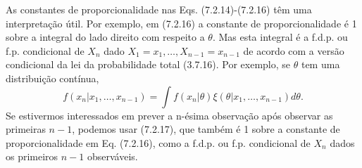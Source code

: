 As constantes de proporcionalidade nas Eqs. (7.2.14)-(7.2.16) têm uma interpretação útil. Por exemplo, em (7.2.16) a constante de proporcionalidade é 1 sobre a integral do lado direito com respeito a $\theta$. Mas esta integral é a f.d.p. ou f.p. condicional de $X_n$ dado $X_1=x_1, \dots, X_{n-1}=x_{n-1}$ de acordo com a versão condicional da lei da probabilidade total (3.7.16). Por exemplo, se $\theta$ tem uma distribuição contínua,
\begin{equation}
f(x_n|x_1, \dots, x_{n-1}) = \int f(x_n|\theta)\xi(\theta|x_1, \dots, x_{n-1})d\theta. \tag{7.2.17}
\end{equation}
Se estivermos interessados em prever a n-ésima observação após observar as primeiras $n-1$, podemos usar (7.2.17), que também é 1 sobre a constante de proporcionalidade em Eq. (7.2.16), como a f.d.p. ou f.p. condicional de $X_n$ dados os primeiros $n-1$ observáveis.

